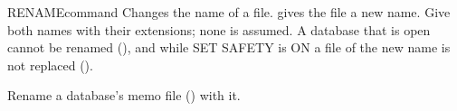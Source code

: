 \begin{XbaseEntry}{RENAME}{command}
Changes the name of a file.
\Syntax
{}
\Usage
{} gives the file a new name.  Give both names with their
extensions; none is assumed.  A database that is open cannot be renamed
(), and while SET SAFETY is ON a file of the
new name is not replaced ().

Rename a database's memo file () with it.
\Examples
{}
\end{XbaseEntry}

